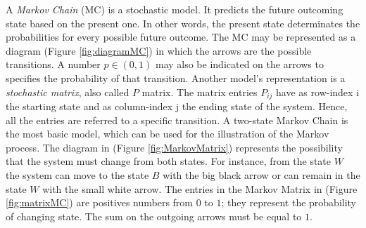 \documentclass[class=article, crop=false]{standalone}
\begin{document}
\label{chap:MarkovChain}

A \emph{Markov Chain} (MC) is a stochastic model. 
It predicts the future outcoming state based on the present one. 
In other words, the present state determinates the probabilities for every possible future outcome. 
The MC may be represented as a diagram (Figure \ref{fig:diagramMC}) \cite{MC_Gagniuc} in which the arrows are the possible transitions. 
A number $p \in (0,1)$ may also be indicated on the arrows to specifies the probability of that transition. 
Another model’s representation is a \emph{stochastic matrix}, also called $P$ matrix. 
The matrix entries $P_{ij}$ have as row-index i the starting state and as column-index j the ending state of the system. 
Hence, all the entries are referred to a specific transition. 
A two-state Markov Chain is the most basic model, which can be used for the illustration of the Markov process. 
The diagram in (Figure \ref{fig:MarkovMatrix}) represents the possibility that the system must change from both states. 
For instance, from the state $W$ the system can move to the state $B$ with the big black arrow or can remain in the state $W$ with the small white arrow.
The entries in the Markov Matrix in (Figure \ref{fig:matrixMC}) are positives numbers from $0$ to $1$; they represent the probability of changing state. 
The sum on the outgoing arrows must be equal to $1$.
\end{document}
